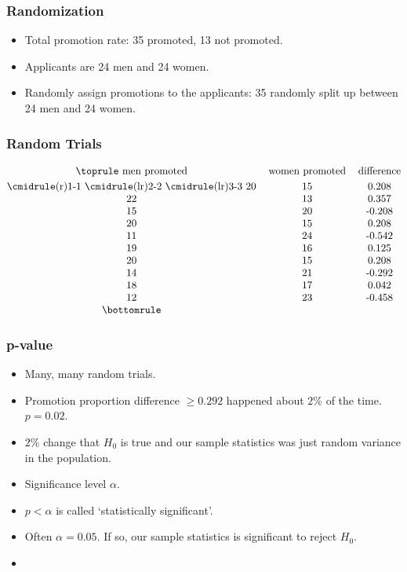 \documentclass{beamer}
\begin{document}
\begin{frame}
  \frametitle{Randomization}
  \begin{itemize}
    \item[] Total promotion rate: 35 promoted, 13 not promoted. 
      \vspace{0.5cm}
    \item[] Applicants are 24 men and 24 women.
      \vspace{0.5cm}
    \item[] Randomly assign promotions to the applicants: 35 randomly
    split up between 24 men and 24 women.
  \end{itemize}
\end{frame}

\begin{frame}
  \frametitle{Random Trials}
  \begin{displaymath}
    \begin{tabular}{@{}ccc@{}}
      \toprule
      men promoted & women promoted & difference \\[0.3em]
      \cmidrule(r){1-1} \cmidrule(lr){2-2} \cmidrule(lr){3-3}
      20 & 15 & 0.208 \\
      22 & 13 & 0.357 \\
      15 & 20 & -0.208 \\ 
      20 & 15 & 0.208 \\
      11 & 24 & -0.542 \\  
      19 & 16 & 0.125 \\
      20 & 15 & 0.208 \\ 
      14 & 21 & -0.292 \\
      18 & 17 & 0.042 \\  
      12 & 23 & -0.458 \\
      \bottomrule
    \end{tabular}
  \end{displaymath} 
\end{frame}

\begin{frame}
  \frametitle{p-value}
  \begin{itemize}
    \item[] 
      Many, many random trials. 
      \vspace{0.5cm}
    \item[] 
      Promotion proportion difference $\geq 0.292$ happened about
      $2\%$ of the time. $p = 0.02$. 
      \vspace{0.5cm}
    \item[] 
      $2\%$ change that $H_0$ is true and our sample statistics was
      just random variance in the population. 
      \vspace{0.5cm}
    \item[] 
      Significance level $\alpha$. 
      \vspace{0.5cm}
    \item[] 
      $p < \alpha$ is called `statistically significant'. 
      \vspace{0.5cm}
    \item[] 
      Often $\alpha = 0.05$. If so, our sample statistics is
      significant to reject $H_0$.
    \item[] 
  \end{itemize}
\end{frame}
\end{document}
